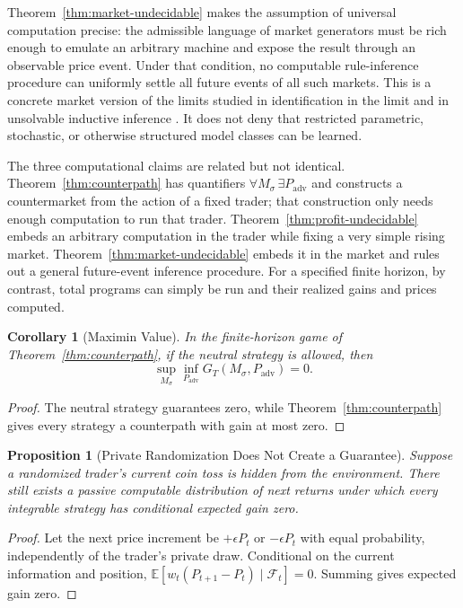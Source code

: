 \documentclass[aps,pra,reprint,superscriptaddress,amsmath,amssymb,floatfix]{revtex4-2}
\theoremstyle{plain}
\newtheorem{corollary}[theorem]{Corollary}
\newtheorem{proposition}[theorem]{Proposition}
\theoremstyle{definition}
\theoremstyle{remark}
\begin{document}
Theorem~\ref{thm:market-undecidable} makes the assumption of universal
computation precise: the admissible language of market generators must be rich
enough to emulate an arbitrary machine and expose the result through an
observable price event. Under that condition, no computable rule-inference
procedure can uniformly settle all future events of all such markets. This is
a concrete market version of the limits studied in identification in the limit
and in unsolvable inductive inference
\cite{go-67,blum75blum,angluin:83,ad-91,2016-AlexanderKarlSvozil-ml,moore}.
It does not deny that restricted parametric, stochastic, or otherwise
structured model classes can be learned.

The three computational claims are related but not identical.
Theorem~\ref{thm:counterpath} has quantifiers
\(\forall M_\sigma\,\exists P_{\mathrm{adv}}\) and constructs a countermarket
from the action of a fixed trader; that construction only needs enough
computation to run that trader. Theorem~\ref{thm:profit-undecidable} embeds an
arbitrary computation in the trader while fixing a very simple rising market.
Theorem~\ref{thm:market-undecidable} embeds it in the market and rules out a
general future-event inference procedure. For a specified finite horizon, by
contrast, total programs can simply be run and their realized gains and prices
computed.

\begin{corollary}[Maximin Value]
  \label{cor:maximin}
  In the finite-horizon game of Theorem~\ref{thm:counterpath}, if the neutral
  strategy is allowed, then
  \[
    \sup_{M_\sigma}\inf_{P_{\mathrm{adv}}}G_T(M_\sigma,P_{\mathrm{adv}})=0.
  \]
\end{corollary}

\begin{proof}
The neutral strategy guarantees zero, while
Theorem~\ref{thm:counterpath} gives every strategy a counterpath with gain at
most zero.
\end{proof}

\begin{proposition}[Private Randomization Does Not Create a Guarantee]
  \label{prop:randomized}
  Suppose a randomized trader's current coin toss is hidden from the
  environment. There still exists a passive computable distribution of next
  returns under which every integrable strategy has conditional expected gain
  zero.
\end{proposition}

\begin{proof}
Let the next price increment be \(+\epsilon P_t\) or \(-\epsilon P_t\) with
equal probability, independently of the trader's private draw. Conditional on
the current information and position,
\(\mathbb{E}[w_t(P_{t+1}-P_t)\mid\mathcal{F}_t]=0\).
Summing gives expected gain zero.
\end{proof}
\end{document}
